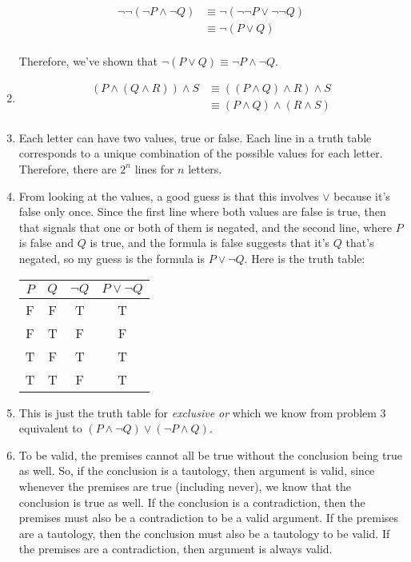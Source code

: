 \documentclass{article}
\begin{document}
\begin{enumerate}
  \begin{equation*}
    \begin{aligned}
      \lnot \lnot (\lnot P \land \lnot Q) & \equiv \lnot (\lnot \lnot P \lor \lnot \lnot Q) \\
      & \equiv \lnot (P \lor Q) \\
      \end{aligned}
  \end{equation*}

  Therefore, we've shown that $\lnot (P \lor Q) \equiv \lnot P \land \lnot Q$.

\item
  \begin{equation*}
    \begin{aligned}
      (P \land (Q \land R)) \land S & \equiv ((P \land Q) \land R) \land S \\
      & \equiv (P \land Q) \land (R \land S) \\
    \end{aligned}
  \end{equation*}

\item Each letter can have two values, true or false.  Each line in a truth table corresponds to a unique combination of the possible values for each letter.  Therefore, there are $2^n$ lines for $n$ letters.

\item From looking at the values, a good guess is that this involves $\lor$ because it's false only once.  Since the first line where both values are false is true, then that signals that one or both of them is negated, and the second line, where $P$ is false and $Q$ is true, and the formula is false suggests that it's $Q$ that's negated, so my guess is the formula is $P \lor \lnot Q$.  Here is the truth table:

  \begin{tabular}{c c c c}
    $P$ & $Q$ & $\lnot Q$ & $P \lor \lnot Q$ \\ \hline
    F & F & T & T \\
    F & T & F & F \\
    T & F & T & T \\
    T & T & F & T \\
    \end{tabular}

\item This is just the truth table for \textit{exclusive or} which we know from problem 3 equivalent to $(P \land \lnot Q) \lor (\lnot P \land Q)$.

\item To be valid, the premises cannot all be true without the conclusion being true as well.  So, if the conclusion is a tautology, then argument is valid, since whenever the premises are true (including never), we know that the conclusion is true as well.  If the conclusion is a contradiction, then the premises must also be a contradiction to be a valid argument.  If the premises are a tautology, then the conclusion must also be a tautology to be valid.  If the premises are a contradiction, then argument is always valid.
\end{enumerate}
\end{document}
